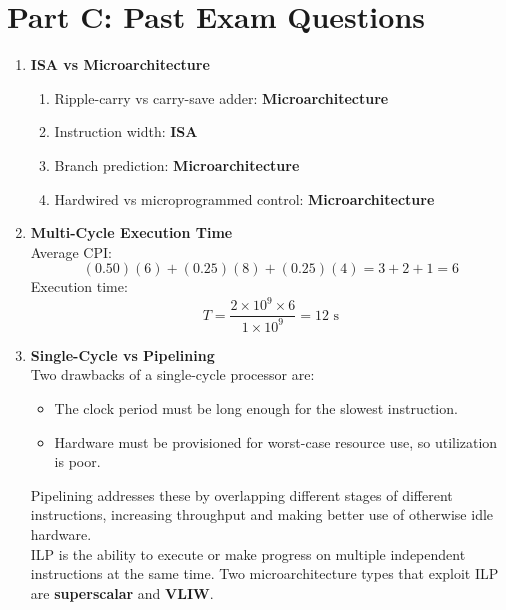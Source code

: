 \documentclass[11pt]{article}
\begin{document}
\section*{Part C: Past Exam Questions}
\begin{enumerate}[label=\textbf{C\arabic*.}]
  \item \textbf{ISA vs Microarchitecture}
  \begin{enumerate}[label=(\alph*)]
    \item Ripple-carry vs carry-save adder: \textbf{Microarchitecture}
    \item Instruction width: \textbf{ISA}
    \item Branch prediction: \textbf{Microarchitecture}
    \item Hardwired vs microprogrammed control: \textbf{Microarchitecture}
  \end{enumerate}

  \item \textbf{Multi-Cycle Execution Time}
  \\[0.5ex]
  Average CPI:
  \[
    (0.50)(6) + (0.25)(8) + (0.25)(4) = 3 + 2 + 1 = 6
  \]
  Execution time:
  \[
    T = \frac{2 \times 10^9 \times 6}{1 \times 10^9} = 12 \text{ s}
  \]

  \item \textbf{Single-Cycle vs Pipelining}
  \\[0.5ex]
  Two drawbacks of a single-cycle processor are:
  \begin{itemize}[leftmargin=1.5em]
    \item The clock period must be long enough for the slowest instruction.
    \item Hardware must be provisioned for worst-case resource use, so utilization is poor.
  \end{itemize}
  Pipelining addresses these by overlapping different stages of different instructions, increasing throughput and making better use of otherwise idle hardware.\\
  ILP is the ability to execute or make progress on multiple independent instructions at the same time. Two microarchitecture types that exploit ILP are \textbf{superscalar} and \textbf{VLIW}.


\end{enumerate}
\end{document}
